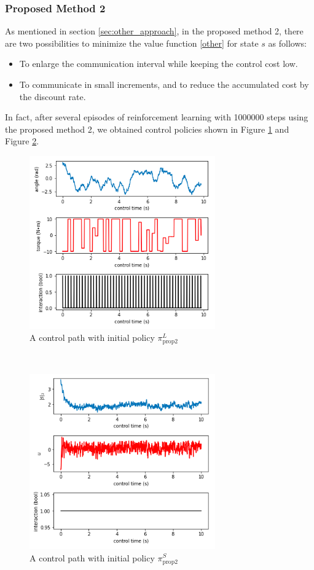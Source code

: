 \documentclass[english, dvipdfmx]{ampmt}             %
\begin{document}
\subsubsection{Proposed Method 2}
As mentioned in section \ref{sec:other_approach}, in the proposed method 2, there are two possibilities to minimize the value function \eqref{other} for state $s$ as follows:
\begin{itemize}
	\item To enlarge the communication interval while keeping the control cost low.
	\item To communicate in small increments, and to reduce the accumulated cost by the discount rate.
\end{itemize}
In fact, after several episodes of reinforcement learning with 1000000 steps using the proposed method 2, we obtained control policies shown in Figure \ref{proposed_2_large} and Figure \ref{proposed_2_small}. 
\begin{figure}[h]%
	\centering
 	\includegraphics[width=8cm]{sample_02.png}
 	\caption{A control path with initial policy $\pi_{\textrm{prop}2}^L$} \label{proposed_2_large}
\end{figure}\\
\begin{figure}[h]
	\centering
 	\includegraphics[width=8cm]{proposed_2_small.png}
 	\caption{A control path with initial policy $\pi_{\textrm{prop}2}^S$} \label{proposed_2_small}
\end{figure}\\
\end{document}
